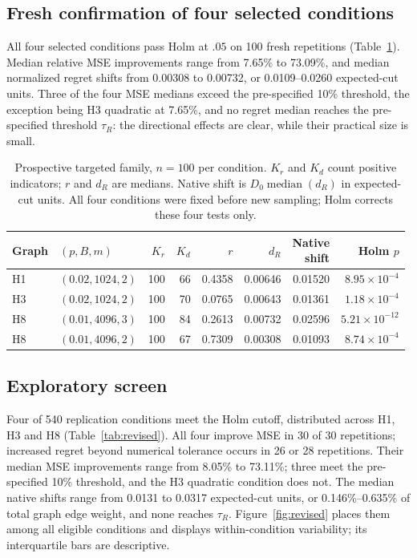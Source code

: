 \subsection{Fresh confirmation of four selected conditions}
All four selected conditions pass Holm at $.05$ on 100 fresh repetitions (Table~\ref{tab:confirmation}). Median relative MSE improvements range from 7.65\% to 73.09\%, and median normalized regret shifts from 0.00308 to 0.00732, or 0.0109--0.0260 expected-cut units. Three of the four MSE medians exceed the pre-specified 10\% threshold, the exception being H3 quadratic at 7.65\%, and no regret median reaches the pre-specified threshold $\tau_R$: the directional effects are clear, while their practical size is small.

\begin{table}[htbp]
\caption{Prospective targeted family, $n=100$ per condition. $K_r$ and $K_d$ count positive indicators; $r$ and $d_R$ are medians. Native shift is $D_0\operatorname{median}(d_R)$ in expected-cut units. All four conditions were fixed before new sampling; Holm corrects these four tests only.}
\label{tab:confirmation}\centering\small
\setlength{\tabcolsep}{2.5pt}
\begin{tabular}{llrrrrrr}\hline
Graph & $(p,B,m)$ & $K_r$ & $K_d$ & $r$ & $d_R$ & \shortstack{Native\\shift} & Holm $p$\\\hline
H1 & $(0.02,1024,2)$ & 100 & 66 & 0.4358 & 0.00646 & 0.01520 & $8.95\times10^{-4}$\\
H3 & $(0.02,1024,2)$ & 100 & 70 & 0.0765 & 0.00643 & 0.01361 & $1.18\times10^{-4}$\\
H8 & $(0.01,4096,3)$ & 100 & 84 & 0.2613 & 0.00732 & 0.02596 & $5.21\times10^{-12}$\\
H8 & $(0.01,4096,2)$ & 100 & 67 & 0.7309 & 0.00308 & 0.01093 & $8.74\times10^{-4}$\\
\hline\end{tabular}
\end{table}

\subsection{Exploratory screen}
Four of 540 replication conditions meet the Holm cutoff, distributed across H1, H3 and H8 (Table~\ref{tab:revised}). All four improve MSE in 30 of 30 repetitions; increased regret beyond numerical tolerance occurs in 26 or 28 repetitions. Their median MSE improvements range from 8.05\% to 73.11\%; three meet the pre-specified 10\% threshold, and the H3 quadratic condition does not. The median native shifts range from 0.0131 to 0.0317 expected-cut units, or 0.146\%--0.635\% of total graph edge weight, and none reaches $\tau_R$. Figure~\ref{fig:revised} places them among all eligible conditions and displays within-condition variability; its interquartile bars are descriptive.


